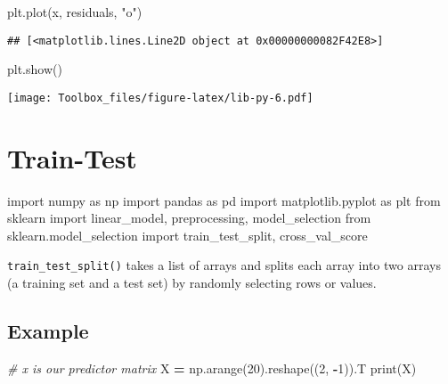 \documentclass[
]{book}
\newenvironment{Shaded}{\begin{snugshade}}{\end{snugshade}}
\newcommand{\BuiltInTok}[1]{#1}
\newcommand{\CommentTok}[1]{\textcolor[rgb]{0.56,0.35,0.01}{\textit{#1}}}
\newcommand{\DecValTok}[1]{\textcolor[rgb]{0.00,0.00,0.81}{#1}}
\newcommand{\ImportTok}[1]{#1}
\newcommand{\NormalTok}[1]{#1}
\newcommand{\OperatorTok}[1]{\textcolor[rgb]{0.81,0.36,0.00}{\textbf{#1}}}
\newcommand{\StringTok}[1]{\textcolor[rgb]{0.31,0.60,0.02}{#1}}
\begin{document}
\begin{Shaded}
\begin{Highlighting}[]
\NormalTok{plt.plot(x, residuals, }\StringTok{"o"}\NormalTok{)}
\end{Highlighting}
\end{Shaded}

\begin{verbatim}
## [<matplotlib.lines.Line2D object at 0x00000000082F42E8>]
\end{verbatim}

\begin{Shaded}
\begin{Highlighting}[]
\NormalTok{plt.show()}
\end{Highlighting}
\end{Shaded}

\texttt{[image: Toolbox\_files/figure-latex/lib-py-6.pdf]}

\hypertarget{train-test}{%
\section{Train-Test}\label{train-test}}

\begin{Shaded}
\begin{Highlighting}[]
\ImportTok{import}\NormalTok{ numpy }\ImportTok{as}\NormalTok{ np}
\ImportTok{import}\NormalTok{ pandas }\ImportTok{as}\NormalTok{ pd}
\ImportTok{import}\NormalTok{ matplotlib.pyplot }\ImportTok{as}\NormalTok{ plt}
\ImportTok{from}\NormalTok{ sklearn }\ImportTok{import}\NormalTok{ linear\_model, preprocessing, model\_selection}
\ImportTok{from}\NormalTok{ sklearn.model\_selection }\ImportTok{import}\NormalTok{ train\_test\_split, cross\_val\_score}
\end{Highlighting}
\end{Shaded}

\texttt{train\_test\_split()} takes a list of arrays and splits each array into two arrays (a training set and a test set) by randomly selecting rows or values.

\hypertarget{example}{%
\subsection{Example}\label{example}}

\begin{Shaded}
\begin{Highlighting}[]
\CommentTok{\# x is our predictor matrix}
\NormalTok{X }\OperatorTok{=}\NormalTok{ np.arange(}\DecValTok{20}\NormalTok{).reshape((}\DecValTok{2}\NormalTok{, }\OperatorTok{{-}}\DecValTok{1}\NormalTok{)).T}
\BuiltInTok{print}\NormalTok{(X)}
\end{Highlighting}
\end{Shaded}
\end{document}
